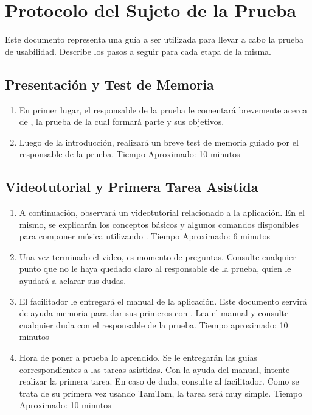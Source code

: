 \section{Protocolo del Sujeto de la Prueba}

Este documento representa una gu\'ia a ser utilizada para llevar a cabo la prueba de usabilidad. 
Describe los pasos a seguir para cada etapa de la misma.

\subsection{Presentaci\'on y Test de Memoria}

\begin{enumerate}
    \item En primer lugar, el responsable de la prueba le comentar\'a brevemente acerca de 
    , la prueba de la cual formar\'a parte y sus objetivos.
    \item Luego de la introducci\'on, realizar\'a un breve test de memoria guiado por el responsable de la prueba. Tiempo Aproximado: 10 minutos
    \setcounter{enumTemp}{\theenumi}
\end{enumerate}

\subsection{Videotutorial y Primera Tarea Asistida}
\begin{enumerate}
    \setcounter{enumi}{\theenumTemp}
    \item A continuaci\'on, observar\'a un videotutorial relacionado a la aplicaci\'on. En el mismo, se
     explicar\'an los conceptos b\'asicos y algunos comandos disponibles para componer m\'usica utilizando 
    . 
    Tiempo Aproximado: 6 minutos
    \item Una vez terminado el video, es momento de preguntas. Consulte cualquier punto que no le haya quedado claro al responsable de la prueba, quien le ayudar\'a a aclarar sus dudas.
    \item El facilitador le entregar\'a el manual de la aplicaci\'on. Este documento servir\'a de ayuda memoria para dar sus primeros con . Lea el manual y consulte cualquier duda con el responsable de la prueba.
        Tiempo aproximado: 10 minutos
    \item Hora de poner a prueba lo aprendido. Se le entregar\'an las gu\'ias correspondientes a las tareas asistidas. Con la ayuda del manual, intente realizar la primera tarea. En caso de duda, consulte al facilitador. Como se trata de su primera vez usando TamTam, la tarea ser\'a muy simple.
    Tiempo Aproximado: 10 minutos
    \setcounter{enumTemp}{\theenumi}
\end{enumerate}

